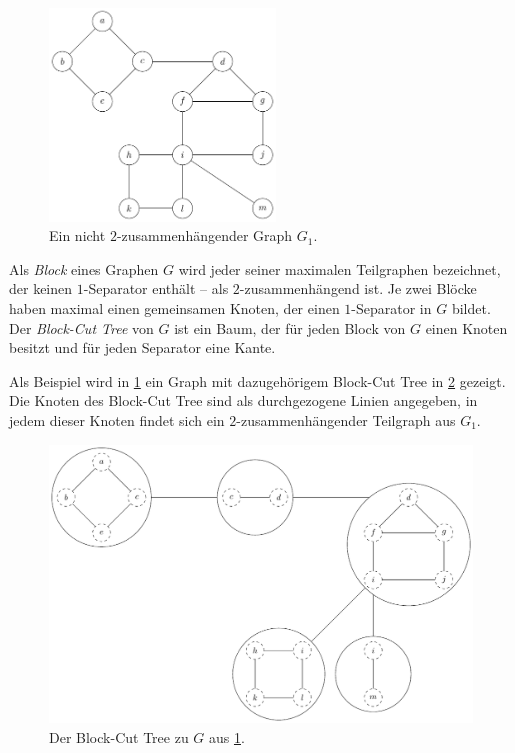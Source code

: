 \begin{figure}
  \includegraphics[width=6cm]{bilder/1-Block-Tree1.pdf}
  \caption{Ein nicht $2$-zusammenhängender Graph $G_1$.}
  \label{fig:1-Block-Tree1}
\end{figure}
\begin{definition}
  Als \emph{Block} eines Graphen $G$ wird jeder seiner maximalen Teilgraphen bezeichnet, der keinen $1$-Separator enthält -- als $2$-zusammenhängend ist.
  Je zwei Blöcke haben maximal einen gemeinsamen Knoten, der einen $1$-Separator in $G$ bildet.
  Der \emph{Block-Cut Tree} von $G$ ist ein Baum, der für jeden Block von $G$ einen Knoten besitzt und für jeden Separator eine Kante\cite{BoM08}.
\end{definition}
Als Beispiel wird in \Abb \ref{fig:1-Block-Tree1} ein Graph mit dazugehörigem Block-Cut Tree in \Abb \ref{fig:1-Block-Tree2} gezeigt.
Die Knoten des Block-Cut Tree sind als durchgezogene Linien angegeben, in jedem dieser Knoten findet sich ein $2$-zusammenhängender Teilgraph aus $G_1$. %
\begin{figure}[H]
  \centering
  \includegraphics[width=\textwidth,height=\textheight,keepaspectratio]{bilder/1-Block-Tree2.pdf}
  \caption{Der Block-Cut Tree zu $G$ aus \Abb \ref{fig:1-Block-Tree1}.}
  \label{fig:1-Block-Tree2}
\end{figure}

